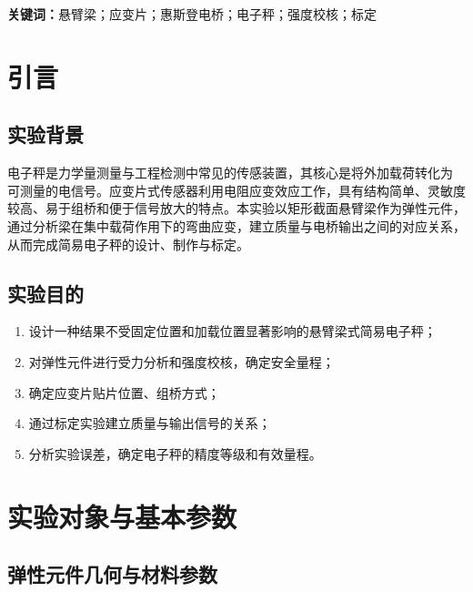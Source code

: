 \documentclass[UTF8,a4paper,zihao=5]{ctexart}
\begin{document}
\noindent\textbf{关键词：}悬臂梁；应变片；惠斯登电桥；电子秤；强度校核；标定

\clearpage
\begingroup
\normalsize
\linespread{1.18}\selectfont
\setlength{\parskip}{0.18em}
\makeatletter
\renewcommand*\l@section{\@dottedtocline{1}{0em}{2.8em}}
\renewcommand*\l@subsection{\@dottedtocline{2}{1.8em}{3.5em}}
\makeatother
\tableofcontents
\endgroup
\clearpage
{}
\setcounter{page}{1}

\section{引言}

\subsection{实验背景}

电子秤是力学量测量与工程检测中常见的传感装置，其核心是将外加载荷转化为
可测量的电信号。应变片式传感器利用电阻应变效应工作，具有结构简单、灵敏度
较高、易于组桥和便于信号放大的特点。本实验以矩形截面悬臂梁作为弹性元件，
通过分析梁在集中载荷作用下的弯曲应变，建立质量与电桥输出之间的对应关系，
从而完成简易电子秤的设计、制作与标定。

\subsection{实验目的}

\begin{enumerate}
  \item 设计一种结果不受固定位置和加载位置显著影响的悬臂梁式简易电子秤；
  \item 对弹性元件进行受力分析和强度校核，确定安全量程；
  \item 确定应变片贴片位置、组桥方式；
  \item 通过标定实验建立质量与输出信号的关系；
  \item 分析实验误差，确定电子秤的精度等级和有效量程。
\end{enumerate}

\section{实验对象与基本参数}

\subsection{弹性元件几何与材料参数}
\end{document}
